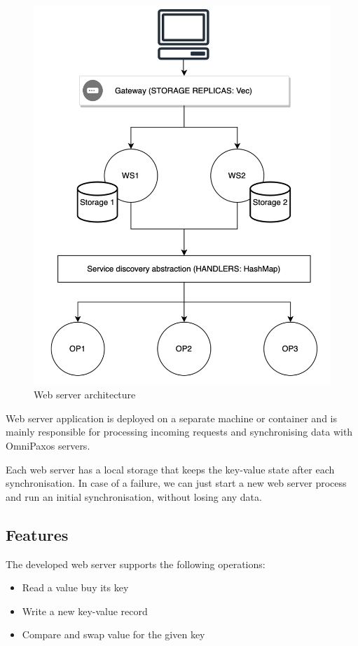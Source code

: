 \documentclass[a4paper, 11pt]{article}
\begin{document}
\begin{figure}[H]
\centering
\includegraphics[width=\textwidth,keepaspectratio]{architecture.png}
\caption{Web server architecture}
\end{figure}

Web server application is deployed on a separate machine or container and is mainly responsible for processing incoming requests and synchronising data with OmniPaxos servers.

Each web server has a local storage that keeps the key-value state after each synchronisation. In case of a failure, we can just start a new web server process and run an initial synchronisation, without losing any data.

\subsection{Features}

The developed web server supports the following operations:
\begin{itemize}
	\item Read a value buy its key
	\item Write a new key-value record
	\item Compare and swap value for the given key
\end{itemize}
\end{document}
